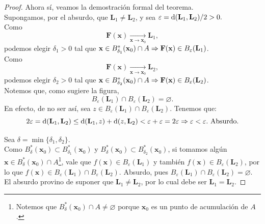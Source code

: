 \begin{theorem}
\begin{proof}
Ahora s\'i, veamos la demostraci\'on formal del teorema.\\
 Supongamos, por el absurdo, que $\mathbf{L}_1 \ne \mathbf{L}_2$, y sea $\varepsilon = \operatorname{d}(\mathbf{L}_1,\mathbf{L}_2)/2 > 0.$ \\ 
 Como 
 \[
  \mathbf{F}(\mathbf{x}) \xrightarrow[\mathbf{x} \to \mathbf{x}_0]{} \mathbf{L}_1,
 \]
podemos elegir $\delta_1 > 0$ tal que $\mathbf{x} \in B_{\delta_1}^*(\mathbf{x}_0) \cap A \Rightarrow \mathbf{F}(\mathbf{x}) \in B_{\varepsilon}(\mathbf{L}_1)$.\\
Como 
\[
 \mathbf{F}(\mathbf{x}) \xrightarrow[\mathbf{x} \to \mathbf{x}_0]{} \mathbf{L}_2,
\]
 podemos elegir $\delta_2 > 0$ tal que $\mathbf{x} \in B_{\delta_2}^*(\mathbf{x}_0) \cap A \Rightarrow \mathbf{F}(\mathbf{x}) \in B_{\varepsilon}(\mathbf{L}_2)$.\\
 Notemos que, como sugiere la figura, 
 \[
  B_{\varepsilon}(\mathbf{L}_1) \cap B_{\varepsilon}(\mathbf{L}_2) = \varnothing.
 \]
 En efecto, de no ser as\'i, sea $z \in B_{\varepsilon}(\mathbf{L}_1) \cap B_{\varepsilon}(\mathbf{L}_2)$. Tenemos que:
 \[
  2 \varepsilon = \operatorname{d}(\mathbf{L}_1,\mathbf{L}_2) \le \operatorname{d}(\mathbf{L}_1,z) + \operatorname{d}(z,\mathbf{L}_2)
  < \varepsilon + \varepsilon = 2 \varepsilon \Rightarrow \varepsilon < \varepsilon. \text{ Absurdo.}
 \]

 Sea $\delta = \min\{ \delta_1, \delta_2 \}$. \\
 Como $B_{\delta}^*(\mathbf{x}_0) \subset B_{\delta_1}^*(\mathbf{x}_0)$ y $B_{\delta}^*(\mathbf{x}_0) \subset B_{\delta_2}^*(\mathbf{x}_0)$, si tomamos alg\'un $\mathbf{x} \in B_{\delta}^*(\mathbf{x}_0) \cap A$\footnote{Notemos que $B_{\delta}^*(\mathbf{x}_0) \cap A \ne \varnothing$ porque $\mathbf{x}_0$ es un punto de acumulaci\'on de $A$.}, vale que $f(\mathbf{x}) \in B_{\varepsilon}(\mathbf{L}_1)$ y tambi\'en $f(\mathbf{x}) \in B_{\varepsilon}(\mathbf{L}_2)$, por lo que $f(\mathbf{x}) \in B_{\varepsilon}(\mathbf{L}_1) \cap B_{\varepsilon}(\mathbf{L}_2)$. Absurdo, pues $B_{\varepsilon}(\mathbf{L}_1) \cap B_{\varepsilon}(\mathbf{L}_2) = \varnothing$. El absurdo provino de suponer que $\mathbf{L}_1 \ne \mathbf{L}_2$, por lo cual debe ser $\mathbf{L}_1 = \mathbf{L}_2$.
\end{proof}

\end{theorem}
